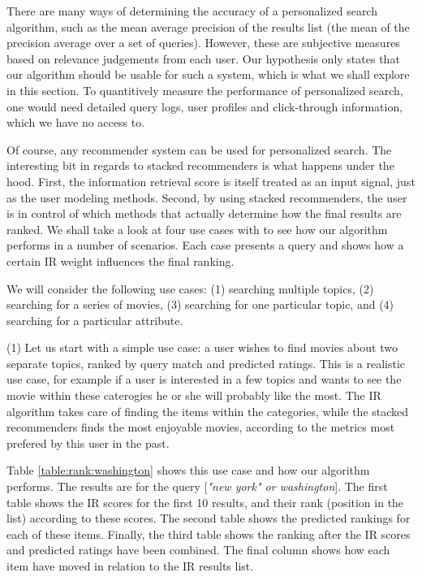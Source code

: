 There are many ways of determining the accuracy of a personalized search
algorithm, such as the mean average precision of the results list
(the mean of the precision average over a set of queries).
However, these are subjective measures based on relevance judgements from each user.
Our hypothesis only states that our algorithm should be usable for such 
a system, which is what we shall explore in this section.
To quantitively measure the performance of personalized search,
one would need detailed query logs, user profiles and click-through information,
which we have no access to.

Of course, any recommender system can be used for personalized search.
The interesting bit in regards to stacked recommenders is what 
happens under the hood. First, the information retrieval score 
is itself treated as an input signal, just as the user modeling methods.
Second, by using stacked recommenders, the user is in control of which
methods that actually determine how the final results are ranked.
We shall take a look at four use cases with to see how our algorithm
performs in a number of scenarios. Each case presents 
a query and shows how a certain IR weight influences the final ranking.

We will consider the following use cases:
(1) searching multiple topics,
(2) searching for a series of movies,
(3) searching for one particular topic, and
(4) searching for a particular attribute.


\afterpage{\clearpage}

(1) Let us start with a simple use case:
a user wishes to find movies about two separate topics, ranked by 
query match and predicted ratings.
This is a realistic use case, for example if a user is interested
in a few topics and wants to see the movie within these caterogies
he or she will probably like the most.
The IR algorithm takes care of finding the items within the categories,
while the stacked recommenders finds the most enjoyable movies,
according to the metrics most prefered by this user in the past.

Table \ref{table:rank:washington} shows this use case and how our algorithm performs.
The results are for the query [\emph{"new york" or washington}].
The first table shows the IR scores for the first 10 results,
and their rank (position in the list) according to these scores.
The second table shows the predicted rankings for each of these items.
Finally, the third table shows the ranking after the IR scores
and predicted ratings have been combined.
The final column shows how each item have moved in relation to the 
IR results list.

